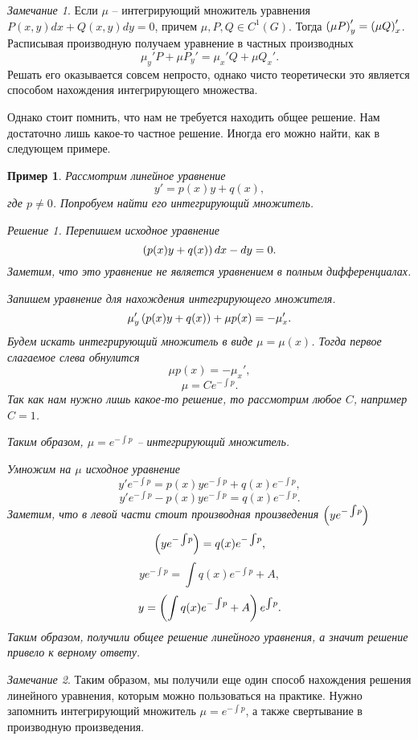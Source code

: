 \documentclass[a5paper, 10pt]{article}
\theoremstyle{definition}
\theoremstyle{plain}
\newtheorem{Ex}{Пример}
\theoremstyle{remark}
\newtheorem*{Note}{Замечание}
\newtheorem*{Solution}{Решение}
\begin{document}
	\begin{Note}
		Если $\mu$ -- интегрирующий множитель уравнения $P(x,y)dx + Q(x,y)dy = 0$, причем $\mu, P, Q \in C^1(G)$. Тогда $\left(\mu P\right)_y' = \left(\mu Q\right)_x'$. Расписывая производную получаем уравнение в частных производных
		\[
		\mu_y' P + \mu P_y' = \mu_x' Q + \mu Q_x'. 
		\] 
		Решать его оказывается совсем непросто, однако чисто теоретически это является способом нахождения интегрирующего множества.
		
		Однако стоит помнить, что нам не требуется находить общее решение. Нам достаточно лишь какое-то частное решение. Иногда его можно найти, как в следующем примере.
	\end{Note}
	\begin{Ex}
		Рассмотрим линейное уравнение
		\[
		y' = p(x) y + q(x), 
		\]
		где $p\neq 0$. Попробуем найти его интегрирующий множитель.
		\begin{Solution}
			Перепишем исходное уравнение 
			\[
			\left(p(x) y + q(x)\right)dx - dy = 0.
			\]
			Заметим, что это уравнение не является уравнением в полным дифференциалах.
			
			Запишем уравнение для нахождения интегрирующего множителя.
			\[
			\mu_y' \left(p(x) y + q(x)\right) + \mu p(x) = -\mu_x'.
			\]
			Будем искать интегрирующий множитель в виде $\mu = \mu(x)$. Тогда первое слагаемое слева обнулится
			\[
			\mu p(x) = -\mu_x',
			\]
			\[
			\mu = C e^{-\int\!p}.
			\]
			Так как нам нужно лишь какое-то решение, то рассмотрим любое $C$, например $C=1$.
			
			Таким образом, $\mu = e^{-\int\!p}$ -- интегрирующий множитель.
			
			Умножим на $\mu$ исходное уравнение
			\[
				y' e^{-\int\!p} = p(x) y e^{-\int\!p}+ q(x)e^{-\int\!p},
			\]
			\[
				y' e^{-\int\!p} - p(x) y e^{-\int\!p} = q(x)e^{-\int\!p}.
			\]
			Заметим, что в левой части стоит производная произведения $\left(ye^{-\int\!p}\right)$
			\[
			\left(ye^{-\int\!p}\right)= q(x)e^{-\int\!p},
			\]
			\[
			ye^{-\int\!p} = \int q(x)e^{-\int\!p} + A,
			\]
			\[
			y = \left(\int q(x)e^{-\int\!p} + A\right)e^{\int\!p}.
			\]
			Таким образом, получили общее решение линейного уравнения, а значит решение привело к верному ответу.
		\end{Solution}
	\end{Ex}
	
	\begin{Note}
		Таким образом, мы получили еще один способ нахождения решения линейного уравнения, которым можно пользоваться на практике. Нужно запомнить интегрирующий множитель $\mu = e^{-\int\!p}$, а также свертывание в производную произведения.
	\end{Note}
\end{document}

